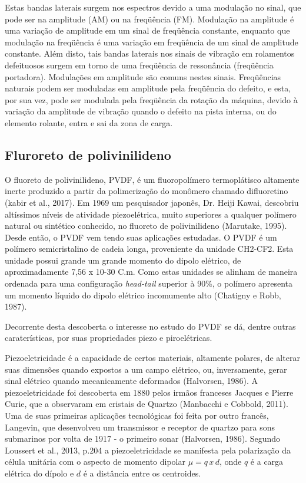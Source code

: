 \documentclass[
	12pt,				
	oneside,			
	a4paper,			
	english,			
	brazil				
	]{abntex2ppgsi}
\begin{document}
\begin{citacao}
Estas bandas laterais surgem nos espectros devido a uma modulação no sinal, que pode ser na amplitude (AM) ou na freqüência (FM). Modulação na amplitude é uma variação de amplitude em um sinal de freqüência constante, enquanto que modulação na freqüência é uma variação em freqüência de um sinal de amplitude constante. Além disto, tais bandas laterais nos sinais de vibração em rolamentos defeituosos surgem em torno de uma freqüência de ressonância (freqüência portadora). Modulações em amplitude são comuns nestes sinais. Freqüências naturais podem ser moduladas em amplitude pela freqüência do defeito, e esta, por sua vez, pode ser modulada pela freqüência da rotação da máquina, devido à variação da amplitude de vibração quando o defeito na pista interna, ou do elemento rolante, entra e sai da zona de carga.
\end{citacao}



\subsection{\textbf{Fluroreto de polivinilideno}}

O fluoreto de polivinilideno, PVDF, é um fluoropolímero termoplátisco altamente inerte produzido a partir da polimerização do monômero chamado difluoretino (kabir et al., 2017). Em 1969 um pesquisador japonês, Dr. Heiji Kawai, descobriu altíssimos níveis de atividade piezoelétrica, muito superiores a qualquer polímero natural ou sintético conhecido, no fluoreto de polivinilideno (Marutake, 1995). Desde então, o PVDF vem tendo suas aplicações estudadas. O PVDF é um polímero semicristalino de cadeia longa, proveniente da unidade CH2-CF2. Esta unidade possui grande um grande momento do dipolo elétrico, de aproximadamente 7,56 x 10-30 C.m. Como estas unidades se alinham de maneira ordenada para uma configuração \textit{head-tail} superior à 90\%, o polímero apresenta um momento líquido do dipolo elétrico incomumente alto (Chatigny e Robb, 1987).

Decorrente desta descoberta o interesse no estudo do PVDF se dá, dentre outras caraterísticas, por suas propriedades piezo e piroelétricas. 

Piezoeletricidade é a capacidade de certos materiais, altamente polares, de alterar suas dimensões quando expostos a um campo elétrico, ou, inversamente, gerar sinal elétrico quando mecanicamente deformados (Halvorsen, 1986). A piezoeletricidade foi descoberta em 1880 pelos irmãos franceses Jacques e Pierre Curie, que a observaram em cristais de Quartzo (Manbacchi e Cobbold, 2011). Uma de suas primeiras aplicações tecnológicas foi feita por outro francês, Langevin, que desenvolveu um transmissor e receptor de quartzo para sons submarinos por volta de 1917 - o primeiro sonar (Halvorsen, 1986). Segundo Loussert et al., 2013, p.204 a piezoeletricidade se manifesta pela polarização da célula unitária com o aspecto de momento dipolar $\mu = q \,x \, d$, onde $q$ é a carga elétrica do dípolo e $d$ é a distância entre os centroides.  
\end{document}
